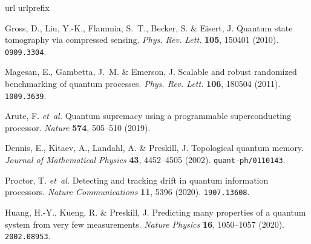 \documentclass[aps,prxquantum,reprint,superscriptaddress,nofootinbib,amsmath,amssymb]{revtex4-2}
\begin{document}
\begin{thebibliography}{10}
\expandafter\ifx\csname url\endcsname\relax
  \def\url#1{\texttt{#1}}\fi
\expandafter\ifx\csname urlprefix\endcsname\relax\def\urlprefix{URL }\fi
\providecommand{\bibinfo}[2]{#2}
\providecommand{\eprint}[2][]{\url{#2}}

\bibinfo{author}{Gross, D.}, \bibinfo{author}{Liu, Y.-K.},
  \bibinfo{author}{Flammia, S.~T.}, \bibinfo{author}{Becker, S.} \&
  \bibinfo{author}{Eisert, J.}
\newblock \bibinfo{title}{Quantum state tomography via compressed sensing}.
\newblock \emph{\bibinfo{journal}{Phys. Rev. Lett.}}
  \textbf{\bibinfo{volume}{105}}, \bibinfo{pages}{150401}
  (\bibinfo{year}{2010}).
\newblock \eprint{0909.3304}.

\bibinfo{author}{Magesan, E.}, \bibinfo{author}{Gambetta, J.~M.} \&
  \bibinfo{author}{Emerson, J.}
\newblock \bibinfo{title}{Scalable and robust randomized benchmarking of quantum
  processes}.
\newblock \emph{\bibinfo{journal}{Phys. Rev. Lett.}}
  \textbf{\bibinfo{volume}{106}}, \bibinfo{pages}{180504}
  (\bibinfo{year}{2011}).
\newblock \eprint{1009.3639}.

\bibinfo{author}{Arute, F.} \emph{et~al.}
\newblock \bibinfo{title}{Quantum supremacy using a programmable superconducting
  processor}.
\newblock \emph{\bibinfo{journal}{Nature}} \textbf{\bibinfo{volume}{574}},
  \bibinfo{pages}{505--510} (\bibinfo{year}{2019}).

\bibinfo{author}{Dennis, E.}, \bibinfo{author}{Kitaev, A.},
  \bibinfo{author}{Landahl, A.} \& \bibinfo{author}{Preskill, J.}
\newblock \bibinfo{title}{Topological quantum memory}.
\newblock \emph{\bibinfo{journal}{Journal of Mathematical Physics}}
  \textbf{\bibinfo{volume}{43}}, \bibinfo{pages}{4452--4505}
  (\bibinfo{year}{2002}).
\newblock \eprint{quant-ph/0110143}.

\bibinfo{author}{Proctor, T.} \emph{et~al.}
\newblock \bibinfo{title}{Detecting and tracking drift in quantum information
  processors}.
\newblock \emph{\bibinfo{journal}{Nature Communications}}
  \textbf{\bibinfo{volume}{11}}, \bibinfo{pages}{5396} (\bibinfo{year}{2020}).
\newblock \eprint{1907.13608}.

\bibinfo{author}{Huang, H.-Y.}, \bibinfo{author}{Kueng, R.} \&
  \bibinfo{author}{Preskill, J.}
\newblock \bibinfo{title}{Predicting many properties of a quantum system from
  very few measurements}.
\newblock \emph{\bibinfo{journal}{Nature Physics}}
  \textbf{\bibinfo{volume}{16}}, \bibinfo{pages}{1050--1057}
  (\bibinfo{year}{2020}).
\newblock \eprint{2002.08953}.


\end{thebibliography}
\end{document}
